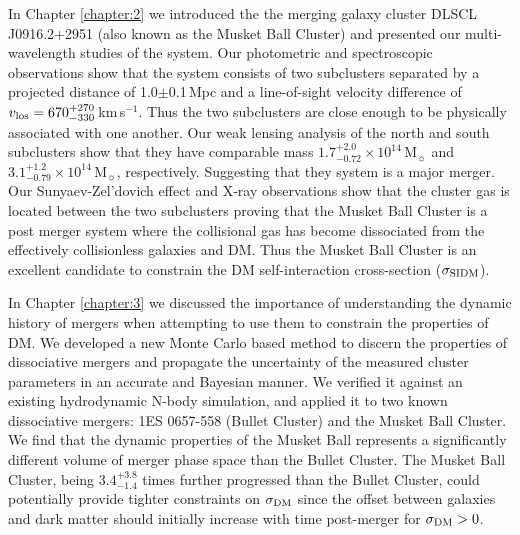 In Chapter \ref{chapter:2} we introduced the the merging galaxy cluster DLSCL J0916.2+2951 (also known as the Musket Ball Cluster) and presented our multi-wavelength studies of the system.
Our photometric and spectroscopic observations show that the system consists of two subclusters separated by a projected distance of 1.0$\pm$0.1\,Mpc and a line-of-sight velocity difference of $v_{\rm los}=670^{+270}_{-330}$\,km\,s$^{-1}$.
Thus the two subclusters are close enough to be physically associated with one another.
Our weak lensing analysis of the north and south subclusters show that they have comparable mass $1.7^{+2.0}_{-0.72}\times10^{14}$\,M$_\sun$  and $3.1^{+1.2}_{-0.79}\times10^{14}$\,M$_\sun$, respectively.
Suggesting that they system is a major merger.
Our Sunyaev-Zel'dovich effect and X-ray observations show that the cluster gas is located between the two subclusters proving that the Musket Ball Cluster is a post merger system where the collisional gas has become dissociated from the effectively collisionless galaxies and DM.
Thus the Musket Ball Cluster is an excellent candidate to constrain the DM self-interaction cross-section ($\sigma_{\rm SIDM}$).

In Chapter \ref{chapter:3} we discussed the importance of understanding the dynamic history of mergers when attempting to use them to constrain the properties of DM.
We developed a new Monte Carlo based method to discern the properties of dissociative mergers and propagate the uncertainty of the measured cluster parameters in an accurate and Bayesian manner.
We verified it against an existing hydrodynamic N-body simulation, and applied it to two known dissociative mergers: 1ES 0657-558 (Bullet Cluster) and the Musket Ball Cluster.
We find that the dynamic properties of the Musket Ball represents a significantly different volume of merger phase space than the Bullet Cluster.
The Musket Ball Cluster, being $3.4^{+3.8}_{-1.4}$ times further progressed than the Bullet Cluster, could potentially provide tighter constraints on $\sigma_{\rm DM}$ since the offset between galaxies and dark matter should initially increase with time post-merger for  $\sigma_{\rm DM}>0$.

